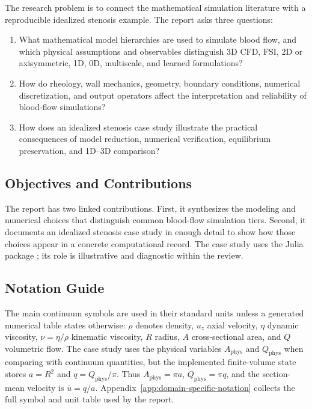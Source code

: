 The research problem is to connect the mathematical simulation literature with
a reproducible idealized stenosis example. The report asks three questions:
\begin{enumerate}
    \item What mathematical model hierarchies are used to simulate blood flow,
    and which physical assumptions and observables distinguish 3D CFD, FSI,
    2D or axisymmetric, 1D, 0D, multiscale, and learned formulations?
    \item How do rheology, wall mechanics, geometry, boundary conditions,
    numerical discretization, and output operators affect the interpretation
    and reliability of blood-flow simulations?
    \item How does an idealized stenosis case study illustrate the practical
    consequences of model reduction, numerical verification, equilibrium
    preservation, and 1D--3D comparison?
\end{enumerate}

\subsection{Objectives and Contributions}
\label{subsec:objectives-contributions}

The report has two linked contributions. First, it synthesizes the modeling
and numerical choices that distinguish common blood-flow simulation tiers.
Second, it documents an idealized stenosis case study in enough detail to show
how those choices appear in a concrete computational record. The case study
uses the Julia package ; its role is illustrative
and diagnostic within the review.

\subsection{Notation Guide}
\label{subsec:intro-notation-guide}

The main continuum symbols are used in their standard units unless a generated
numerical table states otherwise: $\rho$ denotes density, $u_z$ axial velocity,
$\eta$ dynamic viscosity, $\nu=\eta/\rho$ kinematic viscosity, $R$ radius,
$A$ cross-sectional area, and $Q$ volumetric flow. The case study uses the
physical variables $A_{\mathrm{phys}}$ and $Q_{\mathrm{phys}}$ when comparing
with continuum quantities, but the implemented finite-volume state stores
$a=R^2$ and $q=Q_{\mathrm{phys}}/\pi$. Thus
$A_{\mathrm{phys}}=\pi a$, $Q_{\mathrm{phys}}=\pi q$, and the section-mean
velocity is $\bar u=q/a$. Appendix~\ref{app:domain-specific-notation} collects
the full symbol and unit table used by the report.


